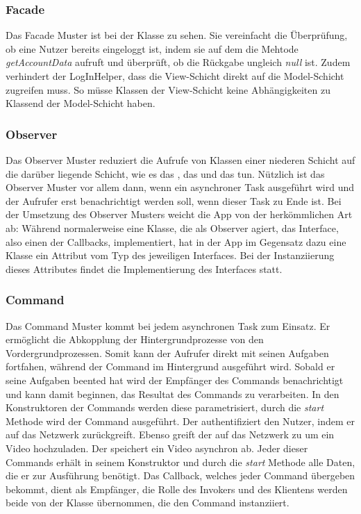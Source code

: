 \subsubsection{Facade}
Das Facade Muster ist bei der Klasse  zu sehen. Sie vereinfacht die Überprüfung, ob eine Nutzer bereits eingeloggt ist, indem sie auf dem  die Mehtode \textit{getAccountData} aufruft und überprüft, ob die Rückgabe ungleich \textit{null} ist. Zudem verhindert der LogInHelper, dass die View-Schicht direkt auf die Model-Schicht zugreifen muss. So müsse Klassen der View-Schicht keine Abhängigkeiten zu Klassend der Model-Schicht haben.

\subsubsection{Observer}
Das Observer Muster reduziert die Aufrufe von Klassen einer niederen Schicht auf die darüber liegende Schicht, wie es das , das  und das  tun. Nützlich ist das Observer Muster vor allem dann, wenn ein asynchroner Task ausgeführt wird und der Aufrufer erst benachrichtigt werden soll, wenn dieser Task zu Ende ist.\newline
Bei der Umsetzung des Observer Musters weicht die App von der herkömmlichen Art ab: Während normalerweise eine Klasse, die als Observer agiert, das Interface, also einen der Callbacks, implementiert, hat in der App im Gegensatz dazu eine Klasse ein Attribut vom Typ des jeweiligen Interfaces. Bei der Instanziierung dieses Attributes findet die Implementierung des Interfaces statt.

\subsubsection{Command}
Das Command Muster kommt bei jedem asynchronen Task zum Einsatz. Er ermöglicht die Abkopplung der Hintergrundprozesse von den Vordergrundprozessen. Somit kann der Aufrufer direkt mit seinen Aufgaben fortfahen, während der Command im Hintergrund ausgeführt wird. Sobald er seine Aufgaben beented hat wird der Empfänger des Commands benachrichtigt und kann damit beginnen, das Resultat des Commands zu verarbeiten.\newline
In den Konstruktoren der Commands werden diese parametrisiert, durch die \textit{start} Methode wird der Command ausgeführt. Der  authentifiziert den Nutzer, indem er auf das Netzwerk zurückgreift. Ebenso greift der  auf das Netzwerk zu um ein Video hochzuladen. Der  speichert ein Video asynchron ab. Jeder dieser Commands erhält in seinem Konstruktor und durch die \textit{start} Methode alle Daten, die er zur Ausführung benötigt. Das Callback, welches jeder Command übergeben bekommt, dient als Empfänger, die Rolle des Invokers und des Klientens werden beide von der Klasse übernommen, die den Command instanziiert.

